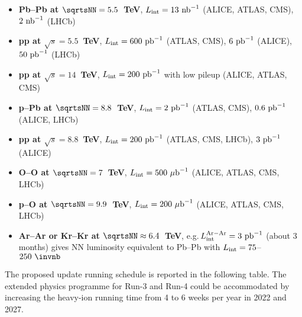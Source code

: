 \documentclass[../report.tex]{subfiles}
\begin{document}
\begin{itemize}

\item {\bf Pb--Pb at $\sqrtsNN=5.5$~TeV}, $L_{\rm int}=13~{\rm nb}^{-1}$ (ALICE, ATLAS, CMS), $2~{\rm nb}^{-1}$ (LHCb)

\item {\bf pp at $\sqrt s=5.5$~TeV}, $L_{\rm int}=600~{\rm pb}^{-1}$ (ATLAS, CMS), $6~{\rm pb}^{-1}$ (ALICE),  $50~{\rm pb}^{-1}$ (LHCb) 

\item {\bf pp at $\sqrt s=14$~TeV}, $L_{\rm int}=200~{\rm pb}^{-1}$ with low pileup (ALICE, ATLAS, CMS)

\item {\bf p--Pb at $\sqrtsNN=8.8$~TeV}, $L_{\rm int}=2~{\rm pb}^{-1}$ (ATLAS, CMS), $0.6~{\rm pb}^{-1}$ (ALICE, LHCb) 

\item {\bf pp at $\sqrt s=8.8$~TeV}, $L_{\rm int}=200~{\rm pb}^{-1}$ (ATLAS, CMS, LHCb), $3~{\rm pb}^{-1}$ (ALICE)

\item {\bf O--O at $\sqrtsNN=7$~TeV}, $L_{\rm int}=500~{\rm \mu b}^{-1}$ (ALICE, ATLAS, CMS, LHCb)

\item {\bf p--O at $\sqrtsNN=9.9$~TeV}, $L_{\rm int}=200~{\rm \mu b}^{-1}$ (ALICE, ATLAS, CMS, LHCb)

\item {\bf Ar--Ar or Kr--Kr at $\sqrtsNN\approx 6.4$~TeV}, e.g.\,$L_{\rm int}^{\rm Ar-Ar}=3~{\rm pb}^{-1}$ (about 3 months) gives NN luminosity equivalent to Pb--Pb with $L_{\rm int} =75$--$250~\invnb$

\end{itemize}

The proposed update running schedule is reported in the following table. The extended physics programme for Run-3 and Run-4 could be accommodated by increasing the heavy-ion running time from 4 to 6 weeks per year in 2022 and 2027. 
\end{document}
